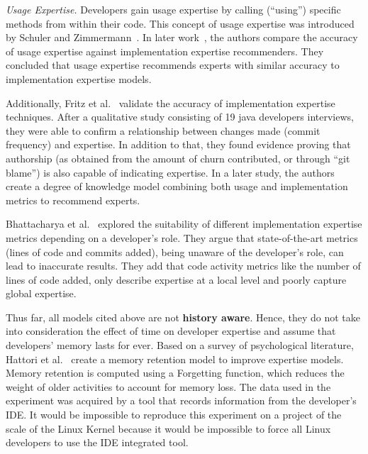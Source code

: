 \textit{Usage Expertise.} Developers gain usage expertise by calling (``using'') specific methods from within their code. This concept of usage expertise was introduced by Schuler and Zimmermann~\cite{Schuler:2008:MUE:1370750.1370779}. In later work~\cite{5306386}, the authors compare the accuracy of usage expertise against implementation expertise recommenders. They concluded that usage expertise recommends experts with similar accuracy to implementation expertise models. 

Additionally, Fritz et al.~\cite{Fritz-2007} validate the accuracy of implementation expertise techniques. After a qualitative study consisting of  19 java developers interviews, they were able to confirm a relationship between changes made (commit frequency) and expertise. In addition to that, they found evidence proving that authorship (as obtained from the amount of churn contributed, or through ``git blame'') is also capable of indicating expertise. In a later study, the authors~\cite{Fritz:2010:DMC:1806799.1806856} create a degree of knowledge model combining both usage and implementation metrics to recommend experts.

Bhattacharya et al.~\cite{Bhattacharya} explored the suitability of different implementation expertise metrics depending on a developer's role. They argue that state-of-the-art metrics (lines of code and commits added), being unaware of the developer's role, can lead to inaccurate results. They add that code activity metrics like the number of lines of code added, only describe expertise at a local level and poorly capture global expertise. 


Thus far, all models cited above are not \textbf{history aware}. Hence, they do not take into consideration the effect of time on developer expertise and assume that developers' memory lasts for ever. Based on a survey of psychological literature, Hattori et al.~\cite{Hattori:2012:RCO:2318097.2318145} create a memory retention model to improve expertise models. Memory retention is computed using a Forgetting function, which reduces the weight of older activities to account for memory loss.
The data used in the experiment was acquired by a tool that records information from the developer's IDE. It would be impossible to reproduce this experiment on a project of the scale of the Linux Kernel because it would be impossible to force all Linux developers to use the IDE integrated tool.


